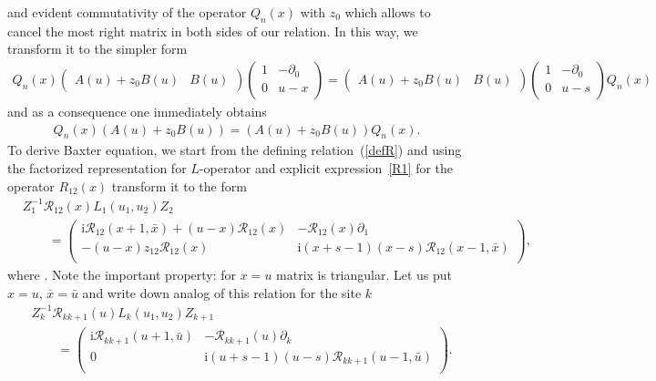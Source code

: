 \documentclass[pdftex]{sigma}
\renewcommand{\imath}{\mathrm{i}}
\numberwithin{equation}{section}
\begin{document}
and evident commutativity of the operator $Q_n( x)$
with $z_0$ which allows to cancel the most right matrix
in both sides of our relation.
In this way, we transform it to the simpler form
\begin{align*}
Q_n(x)
\begin{pmatrix}
A(u)+z_0 B(u) & B(u)
\end{pmatrix}
\begin{pmatrix}
 1 & -\partial_{0} \\
 0 & u-x \\
\end{pmatrix}
 = \begin{pmatrix}
A(u)+z_0 B(u) & B(u)
\end{pmatrix}
\begin{pmatrix}
 1 & -\partial_{0} \\
 0 & u-s \\
\end{pmatrix}
Q_n(x)
\end{align*}
and as a consequence one immediately obtains
\begin{align*}
Q_n(x)
(A(u)+z_0 B(u))
= (A(u)+z_0 B(u))
Q_n(x) .
\end{align*}
To derive Baxter equation, we start from the
defining relation~(\ref{defR}) and using the factorized representation for $L$-operator and explicit expression~\eqref{R1} for the operator $R_{12}( x)$
transform it to the form
\begin{align*}
&
Z_1^{-1}
\mathcal{R}_{12}(x) L_1(u_1,u_2) Z_2 \\
&\qquad{}
=
\begin{pmatrix}
\imath\mathcal{R}_{12}(x+1,\bar{x}) +
(u-x)\mathcal{R}_{12}( x) & -\mathcal{R}_{12}( x)\partial_{1} \\
-(u-x) z_{12} \mathcal{R}_{12}( x) & \imath(x+s-1)(x-s)
\mathcal{R}_{12}(x-1,\bar{x}) \\
\end{pmatrix},
\end{align*}
where .
Note the important property: for $x=u$ matrix is triangular.
Let us put ${x=u}$, ${\bar{x}=\bar{u}}$ and write down analog of
this relation for the site $k$
\begin{align*}
& Z^{-1}_k \mathcal{R}_{k k+1}( u)
 L_k(u_1,u_2) Z_{k+1} \\
& \qquad{} =
\begin{pmatrix}
\imath\mathcal{R}_{k k+1}(u+1,\bar{u}) & -\mathcal{R}_{k k+1}( u)\partial_{k} \\
 0 & \imath(u+s-1)(u-s) \mathcal{R}_{k k+1}(u-1,\bar{u}) \\
\end{pmatrix}.
\end{align*}
\end{document}
